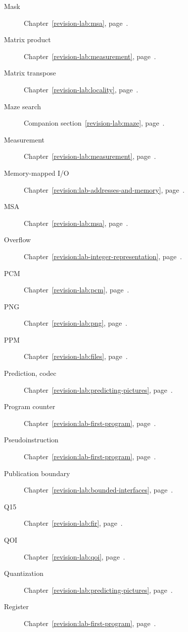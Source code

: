 \begin{description}
  \item[Mask] Chapter~\ref{revision-lab:msa}, page~\pageref{revision-lab:msa}.
  \item[Matrix product] Chapter~\ref{revision-lab:measurement}, page~\pageref{revision-lab:measurement}.
  \item[Matrix transpose] Chapter~\ref{revision-lab:locality}, page~\pageref{revision-lab:locality}.
  \item[Maze search] Companion section~\ref{revision-lab:maze}, page~\pageref{revision-lab:maze}.
  \item[Measurement] Chapter~\ref{revision-lab:measurement}, page~\pageref{revision-lab:measurement}.
  \item[Memory-mapped I/O] Chapter~\ref{revision:lab-addresses-and-memory}, page~\pageref{revision:lab-addresses-and-memory}.
  \item[MSA] Chapter~\ref{revision-lab:msa}, page~\pageref{revision-lab:msa}.
  \item[Overflow] Chapter~\ref{revision:lab-integer-representation}, page~\pageref{revision:lab-integer-representation}.
  \item[PCM] Chapter~\ref{revision-lab:pcm}, page~\pageref{revision-lab:pcm}.
  \item[PNG] Chapter~\ref{revision-lab:png}, page~\pageref{revision-lab:png}.
  \item[PPM] Chapter~\ref{revision-lab:files}, page~\pageref{revision-lab:files}.
  \item[Prediction, codec] Chapter~\ref{revision-lab:predicting-pictures}, page~\pageref{revision-lab:predicting-pictures}.
  \item[Program counter] Chapter~\ref{revision:lab-first-program}, page~\pageref{revision:lab-first-program}.
  \item[Pseudoinstruction] Chapter~\ref{revision:lab-first-program}, page~\pageref{revision:lab-first-program}.
  \item[Publication boundary] Chapter~\ref{revision-lab:bounded-interfaces}, page~\pageref{revision-lab:bounded-interfaces}.
  \item[Q15] Chapter~\ref{revision-lab:fir}, page~\pageref{revision-lab:fir}.
  \item[QOI] Chapter~\ref{revision-lab:qoi}, page~\pageref{revision-lab:qoi}.
  \item[Quantization] Chapter~\ref{revision-lab:predicting-pictures}, page~\pageref{revision-lab:predicting-pictures}.
  \item[Register] Chapter~\ref{revision:lab-first-program}, page~\pageref{revision:lab-first-program}.

\end{description}
